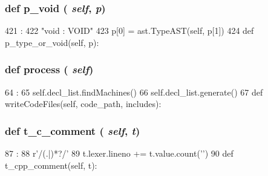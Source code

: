 \begin{DoxyVerb}
{\subsubsection[{p\_\-void}]{\setlength{\rightskip}{0pt plus 5cm}def p\_\-void ( {\em self}, \/   {\em p})}}
\label{classslicc_1_1parser_1_1SLICC_a731b8aa21a36b5326ec2ebe9c8dba349}



\begin{DoxyCode}
421                        :
422         "void : VOID"
423         p[0] = ast.TypeAST(self, p[1])
424 
    def p_type_or_void(self, p):
\end{DoxyCode}
\hypertarget{classslicc_1_1parser_1_1SLICC_a7f3389f4759618032e662129016fc269}{
\subsubsection[{process}]{\setlength{\rightskip}{0pt plus 5cm}def process ( {\em self})}}
\label{classslicc_1_1parser_1_1SLICC_a7f3389f4759618032e662129016fc269}



\begin{DoxyCode}
64                      :
65         self.decl_list.findMachines()
66         self.decl_list.generate()
67 
    def writeCodeFiles(self, code_path, includes):
\end{DoxyCode}
\hypertarget{classslicc_1_1parser_1_1SLICC_a945f66f71618f4c9d3f34f07e5ec379a}{
\subsubsection[{t\_\-c\_\-comment}]{\setlength{\rightskip}{0pt plus 5cm}def t\_\-c\_\-comment ( {\em self}, \/   {\em t})}}
\label{classslicc_1_1parser_1_1SLICC_a945f66f71618f4c9d3f34f07e5ec379a}



\begin{DoxyCode}
87                             :
88         r'/\*(.|\n)*?\*/'
89         t.lexer.lineno += t.value.count('\n')
90 
    def t_cpp_comment(self, t):
\end{DoxyCode}
\hypertarget{classslicc_1_1parser_1_1SLICC_a30488dc841b93edf47146e784f2d61c7}{
}
\end{DoxyVerb}
